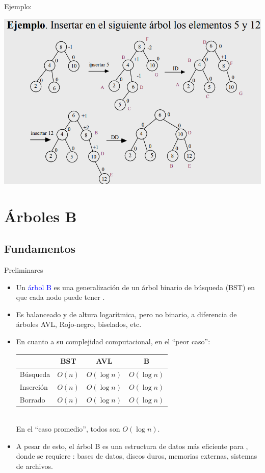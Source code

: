 \documentclass[handout]{beamer} %
\newcommand{\blue}[1]{\textcolor{blue}{#1}}
\newcommand{\redb}[1]{{\color{red!70!black}{#1}}}
\begin{document}
\begin{frame}{Ejemplo:}
    \begin{center}
        \includegraphics[width=\textwidth]{./image/cap3/avl_ej1.PNG}
    \end{center}
\end{frame}

\section{Árboles B}

\subsection{Fundamentos}

\begin{frame}{Preliminares}
    \begin{itemize}
        \item<1-> Un \blue{árbol B} es una generalización de un árbol binario de búsqueda (BST) en que cada nodo puede tener \redb{$> 2$ hijos}.
        \item<2-> Es balanceado y de altura logarítmica, pero no binario, a diferencia de árboles AVL, Rojo-negro, biselados, etc.
        \item<3-> En cuanto a su complejidad computacional, en el ``peor caso'':
        \begin{tabular}{l|ccc}
                      & BST    & AVL         & B \\\hline
            Búsqueda  & $O(n)$ & $O(\log n)$ & $O(\log n)$\\
            Inserción & $O(n)$ & $O(\log n)$ & $O(\log n)$\\
            Borrado   & $O(n)$ & $O(\log n)$ & $O(\log n)$\\
        \end{tabular}\\[1.2ex]

        En el ``caso promedio'', todos son $O(\log n)$.
        \item<4-> A pesar de esto, el árbol B es una estructura de datos más eficiente para \redb{gandes volúmen de datos}, donde se requiere \redb{disminuir el número de accesos}: bases de datos, discos duros, memorias externas, sistemas de archivos.
    \end{itemize}
\end{frame}
\end{document}
